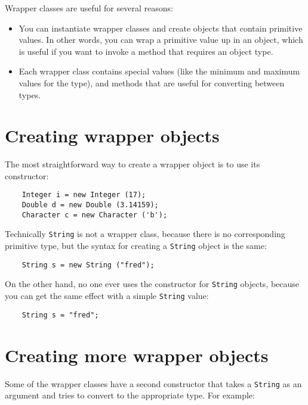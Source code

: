 Wrapper classes are useful for several reasons:

\begin{itemize}

\item You can instantiate wrapper classes and create objects
that contain primitive values.  In other words, you can wrap
a primitive value up in an object, which is useful if you want
to invoke a method that requires an object type.

\item Each wrapper class contains special values (like the
minimum and maximum values for the type), and methods that are useful
for converting between types.

\end{itemize}


\section {Creating wrapper objects}

The most straightforward way to create a wrapper object is
to use its constructor:

\begin{verbatim}
    Integer i = new Integer (17);
    Double d = new Double (3.14159);
    Character c = new Character ('b');
\end{verbatim}
%
Technically {\tt String} is not a wrapper class, because there
is no corresponding primitive type, but the syntax for creating
a {\tt String} object is the same:

\begin{verbatim}
    String s = new String ("fred");
\end{verbatim}
%
On the other hand, no one ever uses the constructor for
{\tt String} objects, because you can get the same effect
with a simple {\tt String} value:

\begin{verbatim}
    String s = "fred";
\end{verbatim}


\section {Creating more wrapper objects}

Some of the wrapper classes have a second constructor that takes
a {\tt String} as an argument and tries to convert
to the appropriate type.  For example:

